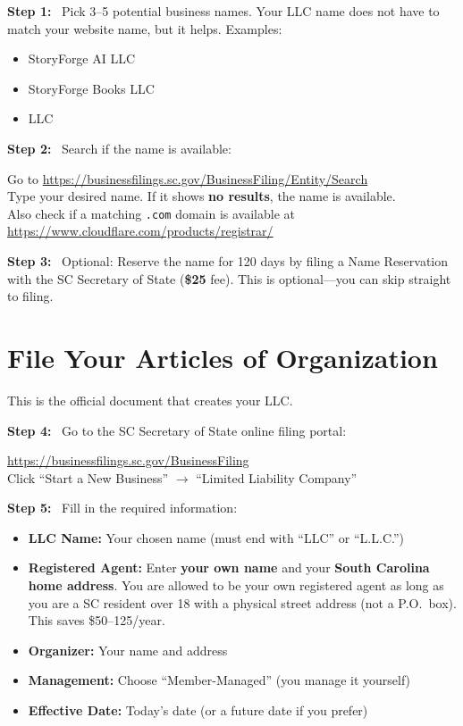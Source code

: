 \documentclass[12pt, letterpaper, oneside]{book}
\newcommand{\cost}[1]{\textcolor{money}{\textbf{#1}}}
\newcommand{\step}[1]{\noindent\textbf{\textcolor{primary}{Step #1:}}~}
\begin{document}
\step{1} Pick 3--5 potential business names. Your LLC name does not have to match your website name, but it helps. Examples:
\begin{itemize}[leftmargin=2em]
  \item StoryForge AI LLC
  \item StoryForge Books LLC
  \item [YourCreativeName] LLC
\end{itemize}

\step{2} Search if the name is available:
\begin{actionbox}
Go to \url{https://businessfilings.sc.gov/BusinessFiling/Entity/Search}\\[4pt]
Type your desired name. If it shows \textbf{no results}, the name is available.\\[4pt]
Also check if a matching \texttt{.com} domain is available at \url{https://www.cloudflare.com/products/registrar/}
\end{actionbox}

\step{3} Optional: Reserve the name for 120 days by filing a Name Reservation with the SC Secretary of State (\cost{\$25} fee). This is optional---you can skip straight to filing.

\section{File Your Articles of Organization}

This is the official document that creates your LLC.

\step{4} Go to the SC Secretary of State online filing portal:
\begin{actionbox}
\url{https://businessfilings.sc.gov/BusinessFiling}\\[4pt]
Click ``Start a New Business'' $\rightarrow$ ``Limited Liability Company''
\end{actionbox}

\step{5} Fill in the required information:
\begin{itemize}[leftmargin=2em]
  \item \textbf{LLC Name:} Your chosen name (must end with ``LLC'' or ``L.L.C.'')
  \item \textbf{Registered Agent:} Enter \textbf{your own name} and your \textbf{South Carolina home address}. You are allowed to be your own registered agent as long as you are a SC resident over 18 with a physical street address (not a P.O.\ box). This saves \$50--125/year.
  \item \textbf{Organizer:} Your name and address
  \item \textbf{Management:} Choose ``Member-Managed'' (you manage it yourself)
  \item \textbf{Effective Date:} Today's date (or a future date if you prefer)
\end{itemize}
\end{document}

